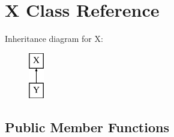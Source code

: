 \section{X Class Reference}
\label{classX}
Inheritance diagram for X\+:\begin{figure}[H]
\begin{center}
\leavevmode
\includegraphics[height=2.000000cm]{classX}
\end{center}
\end{figure}
\subsection*{Public Member Functions}
